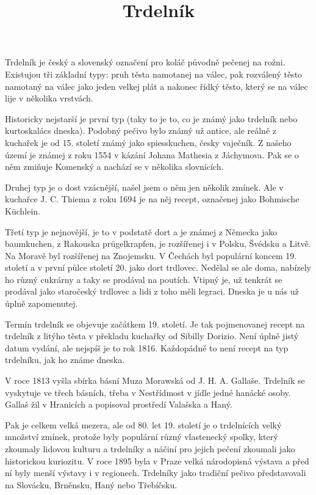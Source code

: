 \documentclass[a5paper,10pt]{book}
\title{Trdelník}
\begin{document}
\frontmatter
\maketitle
\ifdefined\HCode\else
\tableofcontents
\fi

\mainmatter



\lipsum[1-12]

Trdelník je český a slovenský označení pro koláč původně pečenej na rožni.
Existujou tři základní typy: pruh těsta namotanej na válec, pak rozválený těsto
namotaný na válec jako jeden velkej plát a nakonec řídký těsto, který se na
válec lije v několika vrstvách.

Historicky nejstarší je první typ (taky to je to, co je známý jako trdelník
nebo kurtoskalács dneska). Podobný pečivo bylo známý už antice, ale reálně z
kuchařek je od 15. století známý jako spiesskuchen, česky vaječník. Z našeho
území je známej z roku 1554 v kázání Johana Mathesia z Jáchymova. Pak se o něm
zmiňuje Komenský a nachází se v několika slovnících.

Druhej typ je o dost vzácnější, našel jsem o něm jen několik zmínek. Ale v
kuchařce J. C. Thiema z roku 1694 je na něj recept, označenej jako Bohmische
Küchlein.

Třetí typ je nejnovější, je to v podstatě dort a je známej z Německa jako
baumkuchen, z Rakouska prügelkrapfen, je rozšířenej i v Polsku, Švédsku a
Litvě. Na Moravě byl rozšířenej na Znojemsku. V Čechách byl populární koncem
19. století a v první půlce století 20. jako dort trdlovec. Nedělal se ale
doma, nabízely ho různý cukrárny a taky se prodával na poutích. Vtipný je, už
tenkrát se prodával jako staročeský trdlovec a lidi z toho měli legraci. Dneska
je u nás už úplně zapomenutej.

Termín trdelník se objevuje začátkem 19. století. Je tak pojmenovanej recept na
trdelník z litýho těsta v překladu kuchařky od Sibilly Dorizio. Není úplně
jistý datum vydání, ale nejspíš je to rok 1816. Každopádně to není recept na
typ trdelníku, jak ho známe dneska.

V roce 1813 vyšla sbírka básní Muza Morawská od J. H. A. Gallaše. Trdelník se
vyskytuje ve třech básních, třeba v Nestřídmost v jídle jedné hanácké osoby.
Gallaš žil v Hranicích a popisoval prostředí Valašska a Haný.

Pak je celkem velká mezera, ale od 80. let 19. století je o trdelnících velký
množství zmínek, protože byly populární různý vlastenecký spolky, který
zkoumaly lidovou kulturu a trdelníky a náčiní pro jejich pečení zkoumali jako
historickou kuriozitu. V roce 1895 byla v Praze velká národopisná výstava a
před ní byly menší výstavy i v regionech. Trdelníky jako tradiční pečivo
představovali na Slovácku, Brněnsku, Haný nebo Třebíčsku.
\end{document}
